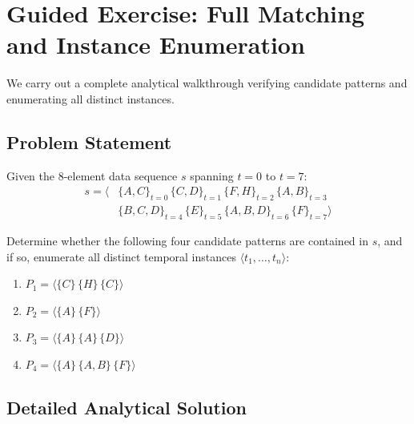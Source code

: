 \section{Guided Exercise: Full Matching and Instance Enumeration}
\label{sec:dm-seq-exercise}

We carry out a complete analytical walkthrough verifying candidate patterns and enumerating all distinct instances.

\subsection{Problem Statement}
Given the 8-element data sequence $s$ spanning $t = 0$ to $t = 7$:
\begin{equation}
\label{eq:seq-exercise-input-en}
\begin{split}
s = \langle &\{A, C\}_{t=0} \, \{C, D\}_{t=1} \, \{F, H\}_{t=2} \, \{A, B\}_{t=3} \\
&\{B, C, D\}_{t=4} \, \{E\}_{t=5} \, \{A, B, D\}_{t=6} \, \{F\}_{t=7} \rangle
\end{split}
\end{equation}

Determine whether the following four candidate patterns are contained in $s$, and if so, enumerate all distinct temporal instances $\langle t_1, \dots, t_n \rangle$:
\begin{enumerate}
    \item $P_1 = \langle \{C\} \, \{H\} \, \{C\} \rangle$
    \item $P_2 = \langle \{A\} \, \{F\} \rangle$
    \item $P_3 = \langle \{A\} \, \{A\} \, \{D\} \rangle$
    \item $P_4 = \langle \{A\} \, \{A, B\} \, \{F\} \rangle$
\end{enumerate}

\subsection{Detailed Analytical Solution}

